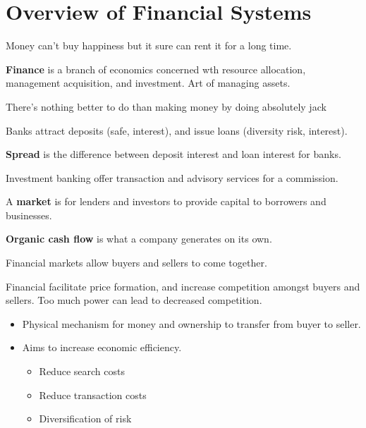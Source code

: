 \documentclass[english, 12pt]{article}
\begin{document}
\notesheader
\section{Overview of Financial Systems}
Money can't buy happiness but it sure can rent it for a long time.
\begin{defn}
\textbf{Finance} is a branch of economics concerned wth resource allocation, management acquisition, and investment. Art of managing assets.
\end{defn}
\begin{qte}
There's nothing better to do than making money by doing absolutely jack
\end{qte}
Banks attract deposits (safe, interest), and issue loans (diversity risk, interest).
\begin{defn}
\textbf{Spread} is the difference between deposit interest and loan interest for banks.
\end{defn}

\begin{note}
Investment banking offer transaction and advisory services for a commission.
\end{note}


\begin{defn}
A \textbf{market} is for lenders and investors to provide capital to borrowers and businesses.
\end{defn}
\begin{defn}
\textbf{Organic cash flow} is what a company generates on its own.
\end{defn}

\begin{qte}
Financial markets allow buyers and sellers to come together.
\end{qte}
\begin{note}
Financial facilitate price formation, and increase competition amongst buyers and sellers. Too much power can lead to decreased competition.

\begin{itemize}
\item Physical mechanism for money and ownership to transfer from buyer to seller.
\item Aims to increase economic efficiency.
\begin{itemize}
\item Reduce search costs
\item Reduce transaction costs
\item Diversification of risk
\end{itemize}
\end{itemize}
\end{note}
\end{document}
